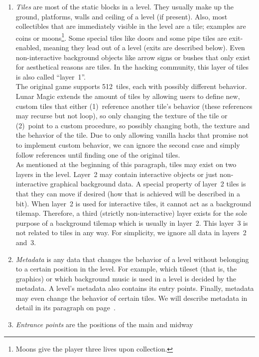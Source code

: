 \begin{enumerate}
\item \emph{Tiles} are most of the static blocks in a level. They
  usually make up the ground, platforms, walls and ceiling of a level
  (if present). Also, most collectibles that are immediately visible
  in the level are a tile; examples are coins or moons\footnote{Moons
    give the player three lives upon collection.}. Some special tiles
  like doors and some pipe tiles are exit-enabled, meaning they lead
  out of a level (exits are described below). Even non-interactive
  background objects like arrow signs or bushes that only exist for
  aesthetical reasons are tiles. In the hacking community, this layer
  of tiles is also called ``layer~1''. \\
  The original game supports 512~tiles, each with possibly different
  behavior. Lunar Magic extends the amount of tiles by allowing users
  to define new, custom tiles that either (1)~reference another tile's
  behavior (these references may recurse but not loop), so only
  changing the texture of the tile or (2)~point to a custom procedure,
  so possibly changing both, the texture and the behavior of the
  tile. Due to only allowing vanilla hacks that promise not to
  implement custom behavior, we can ignore the second case and simply
  follow references until finding one of the original tiles. \\
  As mentioned at the beginning of this paragraph, tiles may exist on
  two layers in the level. Layer~2 may contain interactive objects or
  just non-interactive graphical background data. A special property
  of layer~2 tiles is that they can move if desired (how that is
  achieved will be described in a bit). When layer~2 is used for
  interactive tiles, it cannot act as a background tilemap. Therefore,
  a third (strictly non-interactive) layer exists for the sole purpose
  of a background tilemap which is usually in layer~2. This layer~3 is
  not related to tiles in any way. For simplicity, we ignore all data
  in layers~2 and~3.
\item \emph{Metadata} is any data that changes the behavior of a
  level without belonging to a certain position in the level. For
  example, which tileset (that is, the graphics) or which background
  music is used in a level is decided by the metadata. A level's
  metadata also contains its entry points. Finally, metadata may even
  change the behavior of certain tiles. We will describe metadata in
  detail in its paragraph on page~\pageref{par:metadata}.
\item \emph{Entrance points} are the positions of the main and midway

\end{enumerate}
